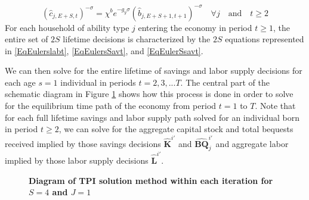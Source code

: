   \begin{equation}\label{EqEulerSsavt}
    (\hat{c}_{j,E+S,t})^{-\sigma} = \chi^b e^{-g_y\sigma}(\hat{b}_{j,E+S+1,t+1})^{-\sigma} \quad\forall j \quad\text{and}\quad t\geq 2
  \end{equation}
  For each household of ability type $j$ entering the economy in period $t\geq 1$, the entire set of $2S$ lifetime decisions is characterized by the $2S$ equations represented in \eqref{EqEulerslabt}, \eqref{EqEulersSavt}, and \eqref{EqEulerSsavt}.

  We can then solve for the entire lifetime of savings and labor supply decisions for each age $s=1$ individual in periods $t=2,3,...T$. The central part of the schematic diagram in Figure \ref{FigTPIdiag} shows how this process is done in order to solve for the equilibrium time path of the economy from period $t=1$ to $T$. Note that for each full lifetime savings and labor supply path solved for an individual born in period $t\geq 2$, we can solve for the aggregate capital stock and total bequests received implied by those savings decisions $\bm{\hat{K}}^{i'}$ and $\bm{\hat{BQ}}_{j}^{i'}$ and aggregate labor implied by those labor supply decisions $\bm{\hat{L}}^{i'}$.

  \begin{figure}[p]\centering \captionsetup{width=4.0in}
    \caption{\label{FigTPIdiag}\textbf{Diagram of TPI solution method within each iteration for $S=4$ and $J=1$}}
  \end{figure}


